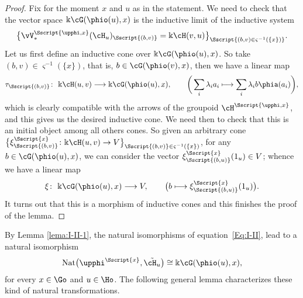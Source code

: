 \begin{proof}Fix for the moment $x$ and $u$ as in the statement. We need to check that the vector space $\Bbbk \cG(\phio(u), x)$ is the inductive limit of the inductive system
\begin{gather*}
\big\{ \vV^{\Sscript{\upphi, x}}_*(\cH_{u})_{\Sscript{(b, v)}}=\Bbbk \cH(v,u) \big\}_{\Sscript{(b, v) \in \varsigma^{-1}(\{x\})}}.
\end{gather*}
Let us first define an inductive cone over $\Bbbk \cG(\phio(u), x)$. So take $(b,v) \in \varsigma^{-1}(\{x\})$, that is, $b \in \cG(\phio(v), x)$, then we have a linear map
\begin{gather*}
\tau_{\Sscript{(b, v)}}\colon \ \Bbbk \cH(u,v) \longrightarrow \Bbbk\cG(\phio(u), x),\qquad \bigg( \sum_{i}\lambda_{i} a_{i} \longmapsto \sum_{i}\lambda_{i} b\phia(a_{i})\bigg),
\end{gather*}
which is clearly compatible with the arrows of the groupoid $\cH^{\Sscript{\upphi, x}}$, and this gives us the desired inductive cone. We need then to check that this is an initial object among all others cones. So given an arbitrary cone $\big\{\xi^{\Sscript{x}}_{\Sscript{(b, v)}}\colon \Bbbk\cH(u,v) \to V\big\}_{\Sscript{(b, v)} \in \varsigma^{-1}(\{x\}) }$, for any $b \in \cG(\phio(u), x)$, we can consider the vector $\xi^{\Sscript{x}}_{\Sscript{(b, u)}}(1_{u}) \in V$; whence we have a linear map
\begin{gather*}
\xi_{ }\colon \ \Bbbk \cG(\phio(u),x) \longrightarrow V, \qquad \big( b \longmapsto \xi^{\Sscript{x}}_{\Sscript{(b, u)}}(1_{u}) \big).
\end{gather*}
It turns out that this is a morphism of inductive cones and this finishes the proof of the lem\-ma.
\end{proof}

By Lemma \ref{lema:I-II-1}, the natural isomorphisms of equation~\eqref{Eq:I-II}, lead to a natural isomorphism
\begin{gather*}
{\rm Nat}\big(\upphi^{\Sscript{x}}, \tilde{\cH_{u}}\big) \cong \Bbbk \cG(\phio(u),x),
\end{gather*}
for every $x \in \Go$ and $u \in \Ho$. The following general lemma characterizes these kind of natural transformations.

